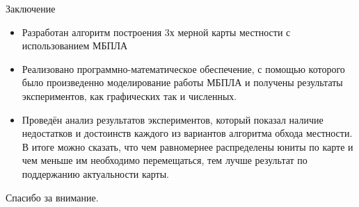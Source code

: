 \begin{tslide}{Заключение}

    \begin{itemize}
    \item Разработан алгоритм построения 3х мерной карты местности 
        с использованием МБПЛА
    \item Реализовано программно-математическое обеспечение, с
        помощью которого было произведенно моделирование работы
        МБПЛА и получены результаты экспериментов, как графических
        так и численных.
    \item Проведён анализ результатов экспериментов, который показал
        наличие недостатков и достоинств каждого из вариантов
        алгоритма обхода местности. В итоге можно сказать, что
        чем равномернее распределены юниты по карте и чем меньше
        им необходимо перемещаться, тем лучше результат по 
        поддержанию актуальности карты.
    \end{itemize}

\end{tslide}

\begin{cslide}
    \LARGE Спасибо за внимание.
\end{cslide}


